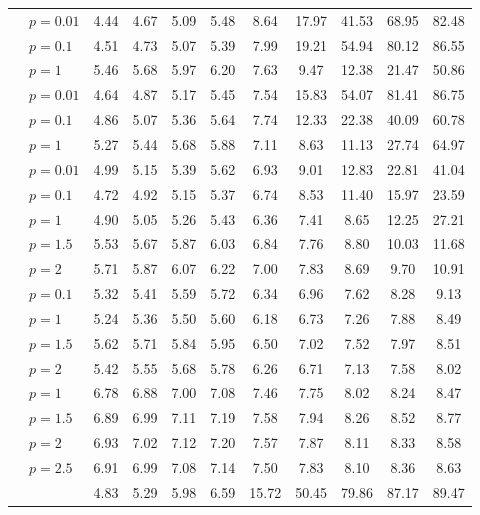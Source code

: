 \begin{table}
\begin{tabular}{| c | l | c | c | c | c | c | c | c | c | c |}
		& \Random[$0.2$] $p{=}0.01$ & 4.44 & 4.67 & 5.09 & 5.48 & 8.64 & 17.97 & 41.53 & 68.95 & 82.48\\
		& \Random[$0.2$] $p{=}0.1$ & 4.51 & 4.73 & 5.07 & 5.39 & 7.99 & 19.21 & 54.94 & 80.12 & 86.55\\
		& \Random[$0.2$] $p{=}1$ & 5.46 & 5.68 & 5.97 & 6.20 & 7.63 & 9.47 & 12.38 & 21.47 & 50.86\\
		& \Random[$0.15$] $p{=}0.01$ & 4.64 & 4.87 & 5.17 & 5.45 & 7.54 & 15.83 & 54.07 & 81.41 & 86.75\\
		& \Random[$0.15$] $p{=}0.1$ & 4.86 & 5.07 & 5.36 & 5.64 & 7.74 & 12.33 & 22.38 & 40.09 & 60.78\\
		& \Random[$0.15$] $p{=}1$ & 5.27 & 5.44 & 5.68 & 5.88 & 7.11 & 8.63 & 11.13 & 27.74 & 64.97\\
		& \Random[$0.1$] $p{=}0.01$ & 4.99 & 5.15 & 5.39 & 5.62 & 6.93 & 9.01 & 12.83 & 22.81 & 41.04\\
		& \Random[$0.1$] $p{=}0.1$ & 4.72 & 4.92 & 5.15 & 5.37 & 6.74 & 8.53 & 11.40 & 15.97 & 23.59\\
		& \Random[$0.1$] $p{=}1$ & 4.90 & 5.05 & 5.26 & 5.43 & 6.36 & 7.41 & 8.65 & 12.25 & 27.21\\
		& \Random[$0.1$] $p{=}1.5$ & 5.53 & 5.67 & 5.87 & 6.03 & 6.84 & 7.76 & 8.80 & 10.03 & 11.68\\
		& \Random[$0.1$] $p{=}2$ & 5.71 & 5.87 & 6.07 & 6.22 & 7.00 & 7.83 & 8.69 & 9.70 & 10.91\\
		& \Random[$0.05$] $p{=}0.1$ & 5.32 & 5.41 & 5.59 & 5.72 & 6.34 & 6.96 & 7.62 & 8.28 & 9.13\\
		& \Random[$0.05$] $p{=}1$ & 5.24 & 5.36 & 5.50 & 5.60 & 6.18 & 6.73 & 7.26 & 7.88 & 8.49\\
		& \Random[$0.05$] $p{=}1.5$ & 5.62 & 5.71 & 5.84 & 5.95 & 6.50 & 7.02 & 7.52 & 7.97 & 8.51\\
		& \Random[$0.05$] $p{=}2$ & 5.42 & 5.55 & 5.68 & 5.78 & 6.26 & 6.71 & 7.13 & 7.58 & 8.02\\
		& \Random[$0.025$] $p{=}1$ & 6.78 & 6.88 & 7.00 & 7.08 & 7.46 & 7.75 & 8.02 & 8.24 & 8.47\\
		& \Random[$0.025$] $p{=}1.5$ & 6.89 & 6.99 & 7.11 & 7.19 & 7.58 & 7.94 & 8.26 & 8.52 & 8.77\\
		& \Random[$0.025$] $p{=}2$ & 6.93 & 7.02 & 7.12 & 7.20 & 7.57 & 7.87 & 8.11 & 8.33 & 8.58\\
		& \Random[$0.025$] $p{=}2.5$ & 6.91 & 6.99 & 7.08 & 7.14 & 7.50 & 7.83 & 8.10 & 8.36 & 8.63\\
		\hline
		\hline
		\multirow{19}{*}{\rotatebox{90}{$m = 4$ bit}} & \Quant & 4.83 & 5.29 & 5.98 & 6.59 & 15.72 & 50.45 & 79.86 & 87.17 & 89.47\\

\end{tabular}
\end{table}
